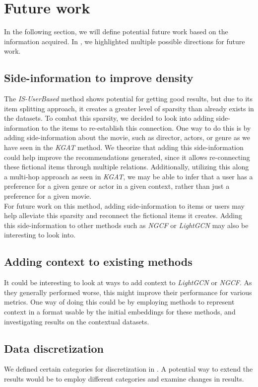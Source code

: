 \section{Future work}\label{sec:futurework}
In the following section, we will define potential future work based on the information acquired.
In , we highlighted multiple possible directions for future work.

\subsection{Side-information to improve density}
The \textit{IS-UserBased} method shows potential for getting good results, but due to its item splitting approach, it creates a greater level of sparsity than already exists in the datasets.
To combat this sparsity, we decided to look into adding side-information to the items to re-establish this connection.
One way to do this is by adding side-information about the movie, such as director, actors, or genre as we have seen in the \textit{KGAT} method.
We theorize that adding this side-information could help improve the recommendations generated, since it allows re-connecting these fictional items through multiple relations.
Additionally, utilizing this along a multi-hop approach as seen in \textit{KGAT}, we may be able to infer that a user has a preference for a given genre or actor in a given context, rather than just a preference for a given movie.\\
For future work on this method, adding side-information to items or users may help alleviate this sparsity and reconnect the fictional items it creates.
Adding this side-information to other methods such as \textit{NGCF} or \textit{LightGCN} may also be interesting to look into.

\subsection{Adding context to existing methods}
It could be interesting to look at ways to add context to \textit{LightGCN} or \textit{NGCF}.
As they generally performed worse, this might improve their performance for various metrics.
One way of doing this could be by employing methods to represent context in a format usable by the initial embeddings for these methods, and investigating results on the contextual datasets.

\subsection{Data discretization}
We defined certain categories for discretization in .
A potential way to extend the results would be to employ different categories and examine changes in results.

